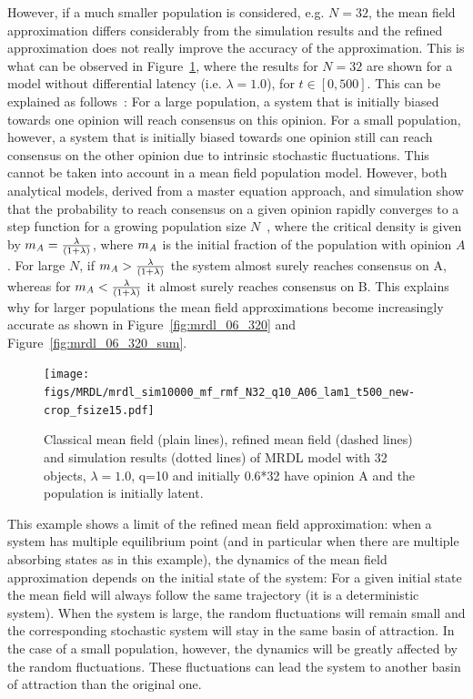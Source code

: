 \documentclass[review]{elsarticle}
\begin{document}
However, if a much smaller population is considered, e.g. $N=32$, the
mean field approximation differs considerably from the simulation
results and the refined approximation does not really improve the
accuracy of the approximation. This is what can be observed in
Figure~\ref{fig:mrdl_06_32}, where the results for $N=32$ are shown for a
model without differential latency (i.e. $\lambda=1.0$), for $t\in [0,500]$.  This can be
explained as follows~: For a large population, a system that is
initially biased towards one opinion will reach consensus on this
opinion. For a small population, however, a system that is initially
biased towards one opinion still can reach consensus on the other
opinion due to intrinsic stochastic fluctuations. This cannot be
taken into account in a mean field population model.  However, both
analytical models, derived from a master equation approach, and
simulation show that the probability to reach consensus on a given
opinion rapidly converges to a step function for a growing population
size $N$~\cite{Sch11}, where the critical density is given by
$m_{\mathit{A}}=\frac{\lambda}{(1+\lambda)}$, where $m_{\mathit{A}}$ is the initial
fraction of the population with opinion $A$. For large $N$, if
$m_{\mathit{A}}>\frac{\lambda}{(1+\lambda)}$ the system almost surely reaches
consensus on A, whereas for $m_{\mathit{A}}<\frac{\lambda}{(1+\lambda)}$ it
almost surely reaches consensus on B.  This explains why for larger
populations the mean field approximations become increasingly accurate
as shown in Figure~\ref{fig:mrdl_06_320} and
Figure~\ref{fig:mrdl_06_320_sum}.

\begin{figure}
\begin{center}
\texttt{[image: figs/MRDL/mrdl\_sim10000\_mf\_rmf\_N32\_q10\_A06\_lam1\_t500\_new-crop\_fsize15.pdf]}
\end{center}
\caption{\label{fig:mrdl_06_32} Classical mean field (plain lines), refined mean field (dashed lines) and simulation results (dotted lines) of MRDL model with 32 objects, $\lambda=1.0$, q=10 and initially 0.6*32 have opinion A and the population is initially latent. }
\end{figure}

This example shows a limit of the refined mean field approximation:
when a system has multiple equilibrium point (and in particular when
there are multiple absorbing states as in this example), the dynamics
of the mean field approximation depends on the initial state of the
system: For a given initial state the mean field will always follow
the same trajectory (it is a deterministic system). When the system is
large, the random fluctuations will remain small and the corresponding
stochastic system will stay in the same basin of attraction.  In the
case of a small population, however, the dynamics will be greatly
affected by the random fluctuations. These fluctuations can lead the
system to another basin of attraction than the original one.
\end{document}

